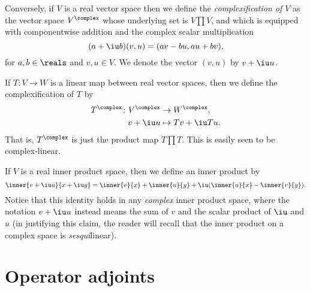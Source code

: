 \documentclass[article, a4paper, 11pt, oneside]{memoir}
\numberwithin{equation}{chapter}
\begin{document}
Conversely, if $V$ is a real vector space then we define the \emph{complexification of $V$} as the vector space $V^\complex$ whose underlying set is $V \prod V$, and which is equipped with componentwise addition and the complex scalar multiplication
%
\begin{equation*}
    (a + \iu b)(v,u)
        = (av - bu, au + bv),
\end{equation*}
%
for $a,b \in \reals$ and $v,u \in V$. We denote the vector $(v,u)$ by $v + \iu u$.



If $T \colon V \to W$ is a linear map between real vector spaces, then we define the complexification of $T$ by
%
\begin{align*}
    T^\complex \colon V^\complex &\to W^\complex, \\
    v + \iu u &\mapsto Tv + \iu Tu.
\end{align*}
%
That is, $T^\complex$ is just the product map $T \prod T$. This is easily seen to be complex-linear.

If $V$ is a real inner product space, then we define an inner product by
%
\begin{equation*}
    \inner{v + \iu u}{x + \iu y}
        = \inner{v}{x}
          + \inner{u}{y}
          + \iu (\inner{u}{x} - \inner{v}{y}).
\end{equation*}
%
Notice that this identity holds in any \emph{complex} inner product space, where the notation $v + \iu u$ instead means the sum of $v$ and the scalar product of $\iu$ and $u$ (in justifying this claim, the reader will recall that the inner product on a complex space is \emph{sesqui}linear).


\chapter{Operator adjoints}
\end{document}

